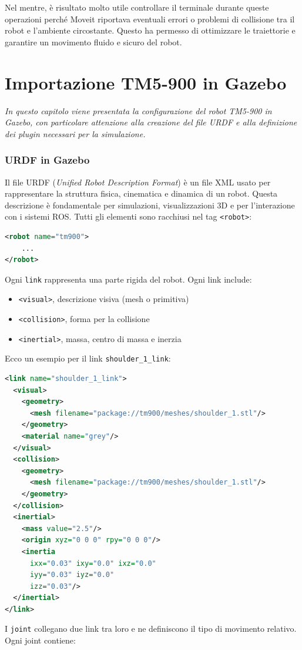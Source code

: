 \documentclass[11pt]{report}
\begin{document}
Nel mentre, è risultato molto utile controllare il terminale durante queste operazioni perché Moveit riportava eventuali errori o problemi di collisione tra il robot e l'ambiente circostante. Questo ha permesso di ottimizzare le traiettorie e garantire un movimento fluido e sicuro del robot.

\section{Importazione TM5-900 in Gazebo}
\label{sec:Importazione_TM5-900_Gazebo}
\textit{In questo capitolo viene presentata la configurazione del robot TM5-900 in Gazebo, con particolare attenzione alla creazione del file URDF e alla definizione dei plugin necessari per la simulazione.}
\subsubsection{URDF in Gazebo}
Il file URDF (\textit{Unified Robot Description Format}) è un file XML usato per rappresentare la struttura fisica, cinematica e dinamica di un robot. Questa descrizione è fondamentale per simulazioni, visualizzazioni 3D e per l'interazione con i sistemi ROS.
\newline
Tutti gli elementi sono racchiusi nel tag \texttt{<robot>}:

\begin{lstlisting}[language=xml]
<robot name="tm900">
    ...
</robot>
\end{lstlisting}
\vspace{1em}
Ogni \texttt{link} rappresenta una parte rigida del robot. Ogni link include:

\begin{itemize}
    \item \texttt{<visual>}, descrizione visiva (mesh o primitiva)
    \item \texttt{<collision>}, forma per la collisione
    \item \texttt{<inertial>}, massa, centro di massa e inerzia
\end{itemize}

Ecco un esempio per il link \texttt{shoulder\_1\_link}:

\begin{lstlisting}[language=xml]
<link name="shoulder_1_link">
  <visual>
    <geometry>
      <mesh filename="package://tm900/meshes/shoulder_1.stl"/>
    </geometry>
    <material name="grey"/>
  </visual>
  <collision>
    <geometry>
      <mesh filename="package://tm900/meshes/shoulder_1.stl"/>
    </geometry>
  </collision>
  <inertial>
    <mass value="2.5"/>
    <origin xyz="0 0 0" rpy="0 0 0"/>
    <inertia
      ixx="0.03" ixy="0.0" ixz="0.0"
      iyy="0.03" iyz="0.0"
      izz="0.03"/>
  </inertial>
</link>
\end{lstlisting}
\vspace{1em}
I \texttt{joint} collegano due link tra loro e ne definiscono il tipo di movimento relativo. Ogni joint contiene:
\end{document}
